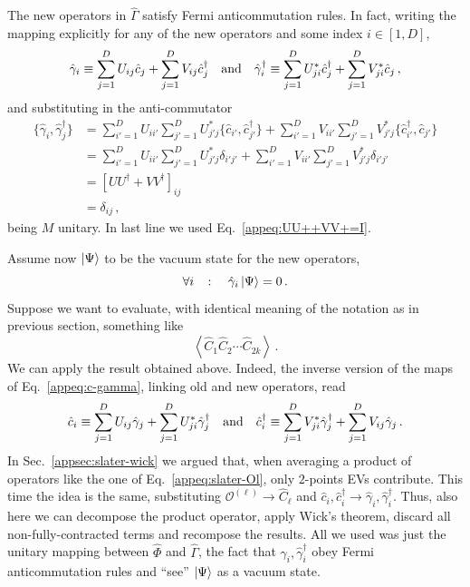The new operators in $\hat \Gamma$ satisfy Fermi anticommutation rules. In fact, writing the mapping explicitly for any of the new operators and some index $i \in [1,D]$,
\begin{equation}\label{appeq:c-gamma}
	\hat \gamma_i \equiv \sum_{j=1}^D U_{ij} \hat c_j + \sum_{j=1}^D V_{ij} \hat c_j^\dagger
	\qq{and}
	\hat \gamma_i^\dagger \equiv \sum_{j=1}^D U_{ji}^* \hat c_j^\dagger + \sum_{j=1}^D V_{ji}^* \hat c_j \, ,
\end{equation}
and substituting in the anti-commutator 
\[
\begin{aligned}
	\lbrace \hat \gamma_i, \hat \gamma_j^\dagger \rbrace &= \sum_{i'=1}^D U_{ii'} \sum_{j'=1}^D U_{j'j}^* \lbrace \hat c_{i'}, \hat c_{j'}^\dagger \rbrace + \sum_{i'=1}^D V_{ii'} \sum_{j'=1}^D V_{j'j}^* \lbrace \hat c_{i'}^\dagger, \hat c_{j'} \rbrace \\
	&= \sum_{i'=1}^D U_{ii'} \sum_{j'=1}^D U_{j'j}^* \delta_{i'j'} + \sum_{i'=1}^D V_{ii'} \sum_{j'=1}^D V_{j'j}^* \delta_{i'j'}\\
	&= \left[ UU^\dagger+VV^\dagger \right]_{ij} \\
	&= \delta_{ij} \, ,
\end{aligned}
\]
being $M$ unitary. In last line we used Eq.~\eqref{appeq:UU++VV+=I}.

Assume now $\ket{\Psi}$ to be the vacuum state for the new operators,
\[
	\forall i
	\quad\colon\quad
	\hat \gamma_i \ket{\Psi} = 0 \, .
\]
Suppose we want to evaluate, with identical meaning of the notation as in previous section, something like
\[
	\left\langle \hat C_1 \hat C_2 \cdots \hat C_{2k} \right\rangle \, .
\]
We can apply the result obtained above. Indeed, the inverse version of the maps of Eq.~\eqref{appeq:c-gamma}, linking old and new operators, read
\begin{equation}\label{appeq:gamma-c}
	\hat c_i \equiv \sum_{j=1}^D U_{ij} \hat \gamma_j + \sum_{j=1}^D U_{ji}^* \hat \gamma_j^\dagger
	\qq{and}
	\hat c_i^\dagger \equiv \sum_{j=1}^D V_{ji}^* \hat \gamma_j^\dagger + \sum_{j=1}^D V_{ij} \hat \gamma_j \, .
\end{equation}
In Sec.~\ref{appsec:slater-wick} we argued that, when averaging a product of operators like the one of Eq.~\eqref{appeq:slater-Ol}, only $2$-points EVs contribute. This time the idea is the same, substituting $\mathcal{O}^{(\ell)} \to \hat C_\ell$ and $\hat c_i, \hat c_i^\dagger \to \hat \gamma_i, \hat \gamma_i^\dagger$. Thus, also here we can decompose the product operator, apply Wick's theorem, discard all non-fully-contracted terms and recompose the results. All we used was just the unitary mapping between $\hat \Phi$ and $\hat \Gamma$, the fact that $\gamma_i, \hat \gamma_i^\dagger$ obey Fermi anticommutation rules and ``see'' $\ket{\Psi}$ as a vacuum state.

